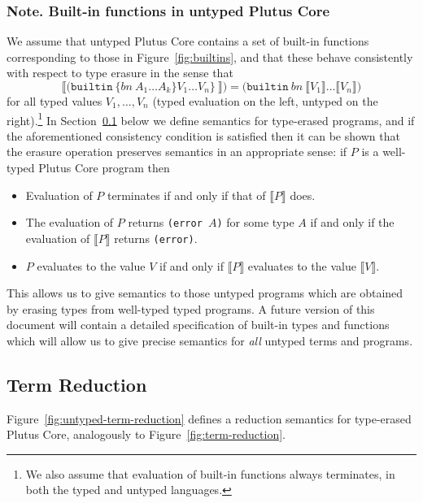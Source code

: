 \documentclass[a4paper]{article}
\newcommand{\keyword}[1]{\texttt{#1}}
\newcommand{\construct}[1]{\texttt{(} #1 \texttt{)}}
\newcommand{\builtin}[3]{\construct{\keyword{builtin} ~ \texttt{\{} \mathit{#1} ~ #2 \texttt{\}} ~ #3}}
\newcommand{\builtinU}[2]{\construct{\keyword{builtin} ~ \mathit{#1} ~ #2}}
\newcommand{\erase}[1]{\llbracket#1\rrbracket}
\begin{document}




\subsubsection{Note. Built-in functions in untyped Plutus Core}
\label{sec:untyped-ck-builtins}
We assume that untyped Plutus Core contains a set of built-in functions
corresponding to those in Figure~\ref{fig:builtins}, and that these
behave consistently with respect to type erasure in the sense that
$$
\erase{\builtin{bn}{A_1 \ldots A_k\}{V_1 \ldots V_n}}} =
\builtinU{bn}{\erase{V_1} \ldots \erase{V_n}}
$$
for all typed values $V_1, \ldots, V_n$ (typed evaluation on the left,
untyped on the right).\footnote{We also assume that evaluation of
built-in functions always terminates, in both the typed and untyped
languages.}  In Section~\ref{sec:untyped-term-reduction} below we
define semantics for type-erased programs, and if the aforementioned
consistency condition is satisfied then it can be shown that the
erasure operation preserves semantics in an appropriate sense: if $P$
is a well-typed Plutus Core program then
\begin{itemize}
\item Evaluation of $P$ terminates if and only if that of $\erase{P}$ does.
\item The evaluation of $P$ returns \texttt{(error $A$)} for some type $A$
if and only if the evaluation of $\erase{P}$ returns \texttt{(error)}.
\item $P$ evaluates to the value $V$ if and only if $\erase{P}$ evaluates to the value
$\erase{V}$.
\end{itemize}
This allows
us to give semantics to those untyped programs which are obtained by
erasing types from well-typed typed programs.  A future version of
this document will contain a detailed specification of built-in types
and functions which will allow us to give precise semantics
for \textit{all} untyped terms and programs.

\subsection{Term Reduction}
\label{sec:untyped-term-reduction}
Figure~\ref{fig:untyped-term-reduction} defines a reduction semantics
for type-erased Plutus Core, analogously to
Figure~\ref{fig:term-reduction}.
\end{document}
